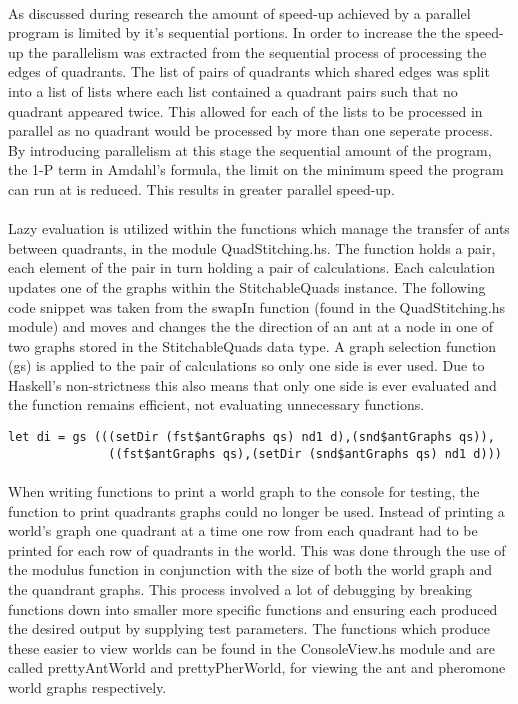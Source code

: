 \documentclass[main.tex]{subfiles}
\begin{document}
\paragraph{} As discussed during research the amount of speed-up achieved by a parallel program is limited by it's sequential portions. In order to increase the the speed-up the parallelism was extracted from the sequential process of processing the edges of quadrants. The list of pairs of quadrants which shared edges was split into a list of lists where each list contained a quadrant pairs such that no quadrant appeared twice. This allowed for each of the lists to be processed in parallel as no quadrant would be processed by more than one seperate process. By introducing parallelism at this stage the sequential amount of the program, the 1-P term in Amdahl's formula, the limit on the minimum speed the program can run at is reduced. This results in greater parallel speed-up. 

\paragraph{}Lazy evaluation is utilized within the functions which manage the transfer of ants between quadrants, in the module QuadStitching.hs. The function holds a pair, each element of the pair in turn holding a pair of calculations. Each calculation updates one of the graphs within the StitchableQuads instance. The following code snippet was taken from the swapIn function (found in the QuadStitching.hs module) and moves and changes the the direction of an ant at a node in one of two graphs stored in the StitchableQuads data type. A graph selection function (gs) is applied to the pair of calculations so only one side is ever used. Due to Haskell's non-strictness this also means that only one side is ever evaluated and the function remains efficient, not evaluating unnecessary functions.

\begin{lstlisting}
let di = gs (((setDir (fst$antGraphs qs) nd1 d),(snd$antGraphs qs)),
              ((fst$antGraphs qs),(setDir (snd$antGraphs qs) nd1 d)))
\end{lstlisting}

\paragraph{} When writing functions to print a world graph to the console for testing, the function to print quadrants graphs could no longer be used. Instead of printing a world's graph one quadrant at a time one row from each quadrant had to be printed for each row of quadrants in the world. This was done through the use of the modulus function in conjunction with the size of both the world graph and the quandrant graphs. This process involved a lot of debugging by breaking functions down into smaller more specific functions and ensuring each produced the desired output by supplying test parameters. The functions which produce these easier to view worlds can be found in the ConsoleView.hs module and are called prettyAntWorld and prettyPherWorld, for viewing the ant and pheromone world graphs respectively.
\end{document}
